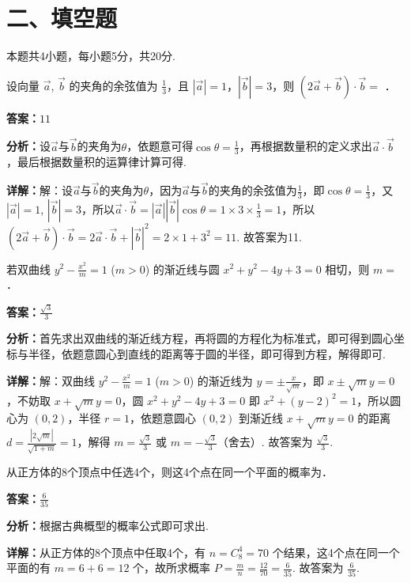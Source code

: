 \section*{二、填空题}
本题共4小题，每小题5分，共20分.

\begin{question}[points=5]
设向量 $\vec{a}$, $\vec{b}$ 的夹角的余弦值为 $\frac{1}{3}$，且 $|\vec{a}|=1$，$|\vec{b}|=3$，则 $(2\vec{a}+\vec{b})\cdot\vec{b}=$ ．
\fillin[{$11$}]
\begin{solution}
\textbf{答案：}$11$

\textbf{分析：}设$\vec{a}$与$\vec{b}$的夹角为$\theta$，依题意可得$\cos\theta=\frac{1}{3}$，再根据数量积的定义求出$\vec{a}\cdot\vec{b}$，最后根据数量积的运算律计算可得.

\textbf{详解：}解：设$\vec{a}$与$\vec{b}$的夹角为$\theta$，因为$\vec{a}$与$\vec{b}$的夹角的余弦值为$\frac{1}{3}$，即$\cos\theta=\frac{1}{3}$，又$|\vec{a}|=1$, $|\vec{b}|=3$，所以$\vec{a}\cdot\vec{b}=|\vec{a}||\vec{b}|\cos\theta=1\times3\times\frac{1}{3}=1$，所以$(2\vec{a}+\vec{b})\cdot\vec{b}=2\vec{a}\cdot\vec{b}+|\vec{b}|^2=2\times1+3^2=11$. 故答案为11.
\end{solution}
\end{question}

\begin{question}[points=5]
若双曲线 $y^2-\frac{x^2}{m}=1$ ($m>0$) 的渐近线与圆 $x^2+y^2-4y+3=0$ 相切，则 $m=$ ．
\begin{solution}
\textbf{答案：}$\frac{\sqrt{3}}{3}$

\textbf{分析：}首先求出双曲线的渐近线方程，再将圆的方程化为标准式，即可得到圆心坐标与半径，依题意圆心到直线的距离等于圆的半径，即可得到方程，解得即可.

\textbf{详解：}解：双曲线 $y^2-\frac{x^2}{m}=1$ ($m>0$) 的渐近线为 $y=\pm\frac{x}{\sqrt{m}}$，即 $x\pm\sqrt{m}y=0$，不妨取 $x+\sqrt{m}y=0$，圆 $x^2+y^2-4y+3=0$ 即 $x^2+(y-2)^2=1$，所以圆心为 $(0,2)$，半径 $r=1$，依题意圆心 $(0,2)$ 到渐近线 $x+\sqrt{m}y=0$ 的距离 $d=\frac{|2\sqrt{m}|}{\sqrt{1+m}}=1$，解得 $m=\frac{\sqrt{3}}{3}$ 或 $m=-\frac{\sqrt{3}}{3}$（舍去）. 故答案为 $\frac{\sqrt{3}}{3}$.
\end{solution}
\end{question}

\begin{question}[points=5]
从正方体的8个顶点中任选4个，则这4个点在同一个平面的概率为．
\fillin[{$\frac{6}{35}$}]
\begin{solution}
\textbf{答案：}$\frac{6}{35}$

\textbf{分析：}根据古典概型的概率公式即可求出.

\textbf{详解：}从正方体的8个顶点中任取4个，有 $n=C_8^4=70$ 个结果，这4个点在同一个平面的有 $m=6+6=12$ 个，故所求概率 $P=\frac{m}{n}=\frac{12}{70}=\frac{6}{35}$. 故答案为 $\frac{6}{35}$.
\end{solution}
\end{question}

